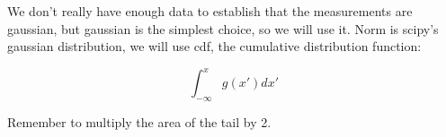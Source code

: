 We don't really have enough data to establish that the measurements are gaussian, but gaussian is the simplest choice, so we will use it. Norm is scipy's gaussian distribution, we will use cdf, the cumulative distribution function: 

$$\int_{-\infty}^x g(x')dx'$$ 

Remember to multiply the area of the tail by 2.